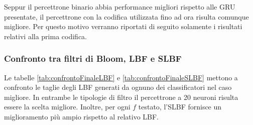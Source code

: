 \documentclass[../../main.tex]{subfiles}
\begin{document}
    Seppur il percettrone binario abbia performance migliori rispetto alle GRU presentate, il percettrone con la codifica utilizzata fino ad ora risulta comunque migliore. Per questo motivo verranno riportati di seguito solamente i risultati relativi alla prima codifica.


    \subsubsection{Confronto tra filtri di Bloom, LBF e SLBF}
    Le tabelle \ref{tab:confrontoFinaleLBF} e \ref{tab:confrontoFinaleSLBF} mettono a confronto le taglie degli LBF generati da ognuno dei classificatori nel caso migliore. In entrambe le tipologie di filtro il percettrone a 20 neuroni risulta essere la scelta migliore. Inoltre, per ogni $f$ testato, l'SLBF fornisce un miglioramento più ampio rispetto al relativo LBF.
\end{document}
